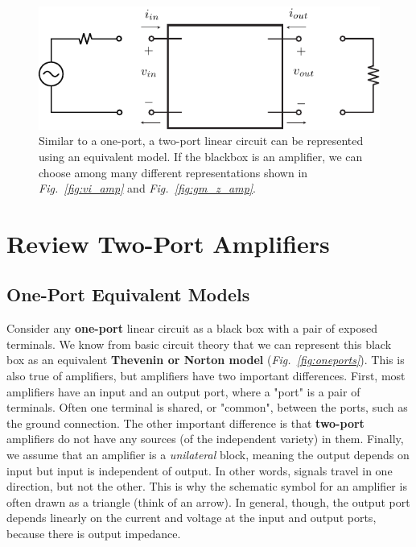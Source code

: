 \begin{figure}[H]
\centering
\includegraphics[scale=1.05]{2port_ss}
\caption{Similar to a one-port, a two-port linear circuit can be represented using an equivalent model.  If the blackbox is an amplifier, we can choose among many different representations shown in \emph{Fig.~\ref{fig:vi_amp}} and \emph{Fig.~\ref{fig:gm_z_amp}}.}
\label{fig:2port_ss}
\end{figure}
\section{Review Two-Port Amplifiers}
\subsection{One-Port Equivalent Models}
Consider any \textbf{one-port} linear circuit as a black box with a pair of exposed terminals.  We know from basic circuit theory that we can represent this black box as an equivalent \textbf{Thevenin or Norton model} (\emph{Fig.~\ref{fig:oneports}}).  This is also true of amplifiers, but amplifiers have two important differences.  First, most amplifiers have an input and an output port, where a "port" is a  pair of terminals.  Often one terminal is shared, or "common", between the ports, such as the ground connection.  The other important difference is that \textbf{two-port} amplifiers do not have any sources (of the independent variety) in them.  Finally, we assume that an amplifier is a \textit{unilateral} block, meaning the output depends on input but input is independent of output.  In other words, signals travel in one direction, but not the other.  This is why the schematic symbol for an amplifier is often drawn as a triangle (think of an arrow).  In general, though, the output port depends linearly on the current and voltage at the input and output ports, because there is output impedance.  

